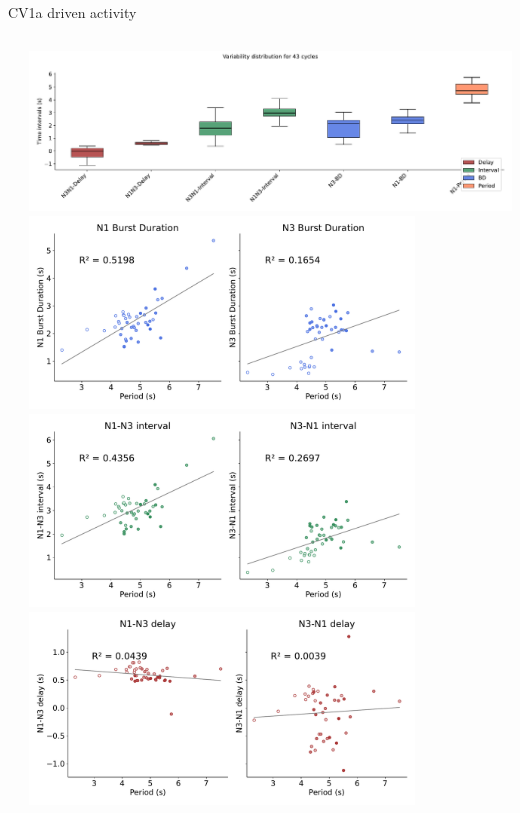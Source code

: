 \documentclass[aspectratio=43]{beamer}
\begin{document}
\begin{frame}{CV1a driven activity}
{\begin{columns}
\begin{column}{0.5\textwidth}
			\end{column}
			\begin{column}{0.5\textwidth}
				\includegraphics[width=\textwidth]{invariants/data/SUSSEX/CV1a_driven2/images/_boxplot_h.pdf}
				\centering
				\includegraphics[width=0.8\textwidth]{invariants/data/SUSSEX/CV1a_driven2/images/_durations.pdf}	\includegraphics[width=0.8\textwidth]{invariants/data/SUSSEX/CV1a_driven2/images/_intervals.pdf}	\includegraphics[width=0.8\textwidth]{invariants/data/SUSSEX/CV1a_driven2/images/_delays.pdf}	
				

\end{column}
\end{columns}}
\end{frame}
\end{document}
